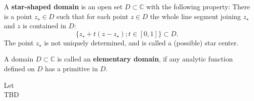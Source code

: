 \begin{definition}
    \label{sec:StarDomain}
    A \textbf{star-shaped domain} is an open set $D \subset \mathbb{C}$ with the following property:
    There is a point $z_\star \in D$ such that for each point $z \in D$ the whole line segment joining $z_\star$ and $z$ is
    contained in $D$:
    $$\{ z_\star + t(z - z_\star) ; t \in [0, 1] \} \subset D .$$
    The point $z_\star$ is not uniquely determined, and is called a (possible) star center.
\end{definition}


\begin{definition}
    \label{sec:ElemDomain}
    A domain $D \subset \mathbb{C}$ is called an \textbf{elementary domain}, if
    any analytic function defined on $D$ has a primitive in $D$.
\end{definition}


\begin{definition}
    \label{sec:EntireFunction}
    Let\\
    TBD
\end{definition}